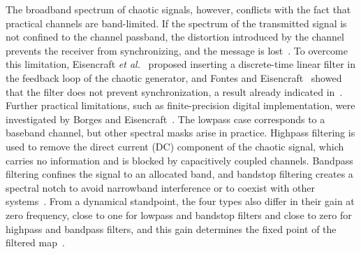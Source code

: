 \documentclass[journal]{IEEEtran}
\begin{document}
The broadband spectrum of chaotic signals, however, conflicts with the fact
that practical channels are band-limited. If the spectrum of the transmitted
signal is not confined to the channel passband, the distortion introduced by
the channel prevents the receiver from synchronizing, and the message is
lost~\cite{Eisencraft2011}. To overcome this limitation, Eisencraft
\textit{et al.}~\cite{Eisencraft2009} proposed inserting a discrete-time
linear filter in the feedback loop of the chaotic generator, and Fontes and
Eisencraft~\cite{Fontes2016} showed that the filter does not prevent
synchronization, a result already indicated in~\cite{Eisencraft2009}.
Further practical limitations, such as finite-precision digital
implementation, were investigated by Borges and
Eisencraft~\cite{Borges2021sbrt}. The lowpass case corresponds to a baseband
channel, but other spectral masks arise in practice. Highpass filtering
is used to remove the direct current (DC) component of the chaotic signal, which carries no information
and is blocked by capacitively coupled channels. Bandpass filtering confines the signal
to an allocated band, and bandstop filtering creates a spectral notch to
avoid narrowband interference or to coexist with other
systems~\cite{Li2013uwb}. From a dynamical standpoint, the four types also differ in their gain at zero
frequency, close to one for lowpass and bandstop filters and close to zero for
highpass and bandpass filters, and this gain determines the fixed point of the
filtered map~\cite{BorgesCNSNS2024}.
\end{document}
